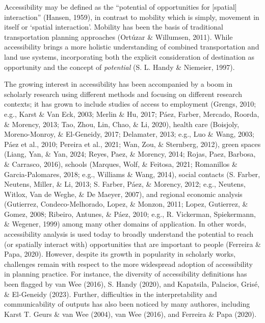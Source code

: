 \documentclass[
11pt, %
oneside, %
english, %
singlespacing, %
]{macthesis} %
\begin{document}
Accessibility may be defined as the ``potential of opportunities for {[}spatial{]} interaction'' (Hansen, 1959), in contrast to mobility which is simply, movement in itself or `spatial interaction'. Mobility has been the basis of traditional transportation planning approaches (Ortúzar \& Willumsen, 2011). While accessibility brings a more holistic understanding of combined transportation and land use systems, incorporating both the explicit consideration of destination as opportunity and the concept of \emph{potential} (S. L. Handy \& Niemeier, 1997).

The growing interest in accessibility has been accompanied by a boom in scholarly research using different methods and focusing on different research contexts; it has grown to include studies of access to employment (Grengs, 2010; e.g., Karst \& Van Eck, 2003; Merlin \& Hu, 2017; Páez, Farber, Mercado, Roorda, \& Morency, 2013; Tao, Zhou, Lin, Chao, \& Li, 2020), health care (Boisjoly, Moreno-Monroy, \& El-Geneidy, 2017; Delamater, 2013; e.g., Luo \& Wang, 2003; Páez et al., 2010; Pereira et al., 2021; Wan, Zou, \& Sternberg, 2012), green spaces (Liang, Yan, \& Yan, 2024; Reyes, Paez, \& Morency, 2014; Rojas, Paez, Barbosa, \& Carrasco, 2016), schools (Marques, Wolf, \& Feitosa, 2021; Romanillos \& Garcia-Palomares, 2018; e.g., Williams \& Wang, 2014), social contacts (S. Farber, Neutens, Miller, \& Li, 2013; S. Farber, Páez, \& Morency, 2012; e.g., Neutens, Witlox, Van de Weghe, \& De Maeyer, 2007), and regional economic analysis (Gutierrez, Condeco-Melhorado, Lopez, \& Monzon, 2011; Lopez, Gutierrez, \& Gomez, 2008; Ribeiro, Antunes, \& Páez, 2010; e.g., R. Vickerman, Spiekermann, \& Wegener, 1999) among many other domains of application. In other words, accessibility analysis is used today to broadly understand the potential to reach (or spatially interact with) opportunities that are important to people (Ferreira \& Papa, 2020). However, despite its growth in popularity in scholarly works, challenges remain with respect to the more widespread adoption of accessibility in planning practice. For instance, the diversity of accessibility definitions has been flagged by van Wee (2016), S. Handy (2020), and Kapatsila, Palacios, Grisé, \& El-Geneidy (2023). Further, difficulties in the interpretability and communicability of outputs has also been noticed by many authores, including Karst T. Geurs \& van Wee (2004), van Wee (2016), and Ferreira \& Papa (2020).
\end{document}
